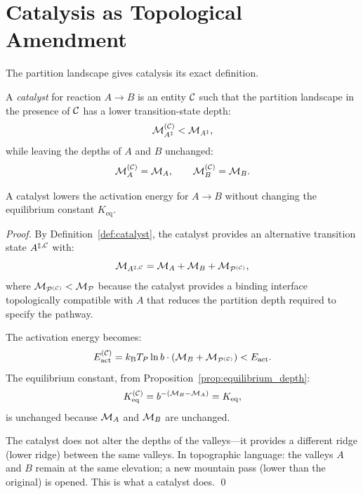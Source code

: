 \section{Catalysis as Topological Amendment}
\label{sec:catalysis}

The partition landscape gives catalysis its exact definition.

\begin{definition}[Catalyst]
\label{def:catalyst}
A \emph{catalyst} for reaction $A \to B$ is an entity $\mathcal{C}$ such that the
partition landscape in the presence of $\mathcal{C}$ has a lower transition-state
depth:
\begin{equation}
  \mathcal{M}_{A^\ddagger}^{(\mathcal{C})} < \mathcal{M}_{A^\ddagger},
\end{equation}
while leaving the depths of $A$ and $B$ unchanged:
\begin{equation}
  \mathcal{M}_A^{(\mathcal{C})} = \mathcal{M}_A, \qquad \mathcal{M}_B^{(\mathcal{C})} = \mathcal{M}_B.
\end{equation}
\end{definition}

\begin{theorem}
\label{thm:catalysis_topological}
A catalyst lowers the activation energy for $A \to B$ without changing the
equilibrium constant $K_{\mathrm{eq}}$.
\end{theorem}

\begin{proof}
By Definition~\ref{def:catalyst}, the catalyst provides an alternative
transition state $A^{\ddagger,\mathcal{C}}$ with:
\begin{equation}
  \mathcal{M}_{A^{\ddagger,\mathcal{C}}} = \mathcal{M}_A + \mathcal{M}_B + \mathcal{M}_{\mathcal{P}^{(\mathcal{C})}},
\end{equation}
where $\mathcal{M}_{\mathcal{P}^{(\mathcal{C})}} < \mathcal{M}_{\mathcal{P}}$ because the
catalyst provides a binding interface topologically compatible with $A$ that
reduces the partition depth required to specify the pathway.

The activation energy becomes:
\begin{equation}
  E_{\mathrm{act}}^{(\mathcal{C})} = k_{\mathrm{B}} T_P \ln b \cdot (\mathcal{M}_B + \mathcal{M}_{\mathcal{P}^{(\mathcal{C})}})
                             < E_{\mathrm{act}}.
\end{equation}
The equilibrium constant, from Proposition~\ref{prop:equilibrium_depth}:
\begin{equation}
  K_{\mathrm{eq}}^{(\mathcal{C})} = b^{-(\mathcal{M}_B - \mathcal{M}_A)} = K_{\mathrm{eq}},
\end{equation}
is unchanged because $\mathcal{M}_A$ and $\mathcal{M}_B$ are unchanged.

The catalyst does not alter the depths of the valleys---it provides a different
ridge (lower ridge) between the same valleys. In topographic language: the
valleys $A$ and $B$ remain at the same elevation; a new mountain pass (lower
than the original) is opened. This is what a catalyst does. \qed
\end{proof}

